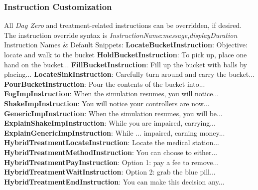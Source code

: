 \documentclass{article}
\begin{document}
\subsubsection*{Instruction Customization} All \textit{Day Zero} and treatment-related instructions can be overridden, if desired. The instruction override syntax is \textit{InstructionName}:\textit{message},\textit{displayDuration}
\newline \newline \indent Instruction Names \& Default Snippets:
\newline \indent\indent \textbf{LocateBucketInstruction}: Objective: locate and walk to the bucket 
\newline \indent\indent \textbf{HoldBucketInstruction}: To pick up, place one hand on the bucket... 
\newline \indent\indent \textbf{FillBucketInstruction}: Fill up the bucket with balls by placing...
\newline \indent\indent \textbf{LocateSinkInstruction}: Carefully turn around and carry the bucket...
\newline \indent\indent \textbf{PourBucketInstruction}: Pour the contents of the bucket into...
\newline \indent\indent \textbf{FogImpInstruction}: When the simulation resumes, you will notice... 
\newline \indent\indent \textbf{ShakeImpInstruction}: You will notice your controllers are now... 
\newline \indent\indent \textbf{GenericImpInstruction}: When the simulation resumes, you will be...
\newline \indent\indent \textbf{ExplainShakeImpInstruction}: While you are impaired, carrying...
\newline \indent\indent \textbf{ExplainGenericImpInstruction}: While ... impaired, earning money... 
\newline \indent\indent \textbf{HybridTreatmentLocateInstruction}: Locate the medical station... 
\newline \indent\indent \textbf{HybridTreatmentMethodInstruction}: You can choose to either... 
\newline \indent\indent \textbf{HybridTreatmentPayInstruction}: Option 1: pay a fee to remove... 
\newline \indent\indent \textbf{HybridTreatmentWaitInstruction}: Option 2: grab the blue pill... 
\newline \indent\indent \textbf{HybridTreatmentEndInstruction}: You can make this decision any... 
\end{document}

